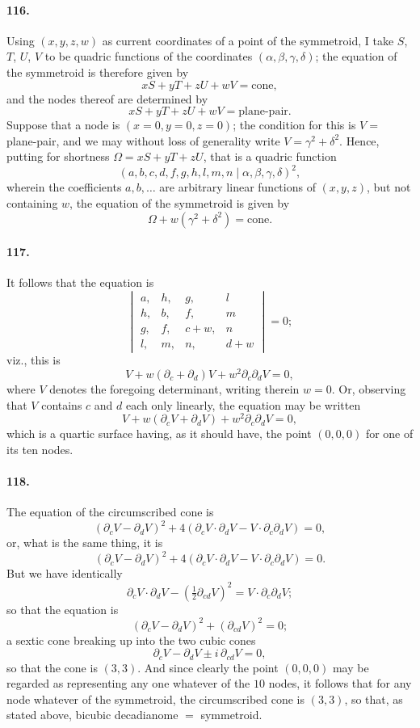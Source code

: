\documentclass[11pt,a4paper]{article}
\begin{document}
\paragraph{116.}
Using $(x, y, z, w)$ as current coordinates of a point of the symmetroid,
I take $S$, $T$, $U$, $V$ to be quadric functions of the coordinates
$(\alpha, \beta, \gamma, \delta)$; the equation of the symmetroid is
therefore given by
\[
xS + yT + zU + wV = \text{cone},
\]
and the nodes thereof are determined by
\[
xS + yT + zU + wV = \text{plane-pair}.
\]
Suppose that a node is $(x = 0, y = 0, z = 0)$; the condition for this is
$V = $ plane-pair, and we may without loss of generality write
$V = \gamma^2 + \delta^2$. Hence, putting for shortness
$\Omega = xS + yT + zU$, that is a quadric function
\[
(a, b, c, d, f, g, h, l, m, n \!\mid\! \alpha, \beta, \gamma, \delta)^2,
\]
wherein the coefficients $a, b, \dotsc$ are arbitrary linear functions of
$(x, y, z)$, but not containing $w$, the equation of the symmetroid is
given by
\[
\Omega + w(\gamma^2 + \delta^2) = \text{cone}.
\]

\paragraph{117.}
It follows that the equation is
\[
\begin{vmatrix}
a, & h, & g, & l \\
h, & b, & f, & m \\
g, & f, & c + w, & n \\
l, & m, & n, & d + w
\end{vmatrix}
= 0;
\]
viz., this is
\[
V + w (\partial_c + \partial_d) V + w^2 \partial_c \partial_d V = 0,
\]
where $V$ denotes the foregoing determinant, writing therein $w = 0$. Or,
observing that $V$ contains $c$ and $d$ each only linearly, the equation
may be written
\[
V + w (\partial_c V + \partial_d V) + w^2 \partial_c \partial_d V = 0,
\]
which is a quartic surface having, as it should have, the point
$(0, 0, 0)$ for one of its ten nodes.

\paragraph{118.}
The equation of the circumscribed cone is
\[
(\partial_c V - \partial_d V)^2 + 4 (\partial_c V \cdot \partial_d V
- V \cdot \partial_c \partial_d V) = 0,
\]
or, what is the same thing, it is
\[
(\partial_c V - \partial_d V)^2 + 4 (\partial_c V \cdot \partial_d V
- V \cdot \partial_c \partial_d V) = 0.
\]
But we have identically
\[
\partial_c V \cdot \partial_d V - (\tfrac{1}{2} \partial_{cd} V)^2
= V \cdot \partial_c \partial_d V;
\]
so that the equation is
\[
(\partial_c V - \partial_d V)^2 + (\partial_{cd} V)^2 = 0;
\]
a sextic cone breaking up into the two cubic cones
\[
\partial_c V - \partial_d V \pm i\, \partial_{cd} V = 0,
\]
so that the cone is $(3, 3)$. And since clearly the point $(0, 0, 0)$ may
be regarded as representing any one whatever of the $10$ nodes, it follows
that for any node whatever of the symmetroid, the circumscribed cone is
$(3, 3)$, so that, as stated above, bicubic decadianome $=$ symmetroid.
\end{document}
